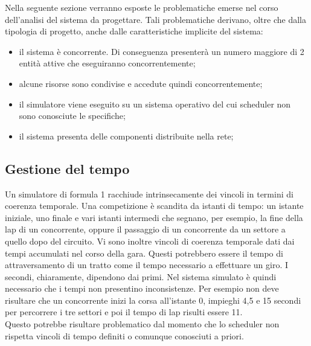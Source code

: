 Nella seguente sezione verranno esposte le problematiche emerse nel corso
dell'analisi del sistema da progettare. Tali
problematiche derivano, oltre che dalla tipologia di progetto, anche dalle
caratteristiche implicite del sistema:
\begin{itemize}
\item il sistema è concorrente. Di conseguenza presenterà un numero maggiore di
2 entità attive
che eseguiranno concorrentemente;
\item alcune risorse sono condivise e accedute quindi concorrentemente;
\item il simulatore viene eseguito su un sistema operativo del cui scheduler non
sono conosciute le specifiche;
\item il sistema presenta delle componenti distribuite nella rete;
\end{itemize}
\subsection{Gestione del tempo}
Un simulatore di formula 1 racchiude intrinsecamente dei vincoli in termini di
coerenza temporale. 
Una competizione è scandita da istanti di tempo: un istante iniziale, uno finale
e vari istanti 
intermedi che segnano, per esempio, la fine della lap di un concorrente, oppure
il passaggio di un concorrente da un settore
a quello dopo del circuito. Vi sono inoltre vincoli di coerenza temporale dati
dai tempi accumulati nel corso
della gara. Questi potrebbero essere il tempo di attraversamento di un tratto
come il tempo necessario
a effettuare un giro. I secondi, chiaramente, dipendono dai primi. 
Nel sistema simulato è quindi necessario che i tempi non presentino inconsistenze.
Per esempio non deve risultare che un concorrente inizi la corsa all'istante 0,
impieghi 4,5 e 15 secondi per percorrere i tre settori e poi il tempo di lap
risulti essere 11.\\
Questo potrebbe risultare
problematico dal momento che
lo scheduler non rispetta vincoli di tempo definiti o comunque conosciuti a
priori.
